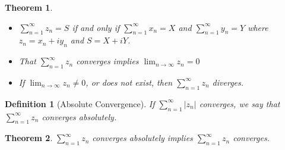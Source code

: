 \documentclass[12pt]{article}
\newtheorem{definition}{Definition}[section]
\newtheorem{theorem}{Theorem}[section]
\theoremstyle{definition}
\begin{document}
\begin{theorem}
\normalfont \begin{itemize}
\item $\sum_{n=1}^\infty z_n = S$ if and only if $\sum_{n=1}^\infty x_n = X$ and $\sum_{n=1}^\infty y_n = Y$ where $z_n = x_n + iy_n$ and $S=X+iY$.
\item That $\sum_{n=1}^\infty z_n$ converges implies $\lim_{n\to\infty}z_n = 0$
\item If $\lim_{n\to\infty}z_n \neq 0$, or does not exist, then $\sum_{n=1}^\infty z_n$ diverges.
\end{itemize}
\end{theorem}
\begin{definition}[Absolute Convergence]
\normalfont If $\sum_{n=1}^\infty |z_n|$ converges, we say that $\sum_{n=1}^\infty z_n$ converges absolutely.\end{definition}
\begin{theorem}\normalfont $\sum_{n=1}^\infty z_n$ converges absolutely implies $\sum_{n=1}^\infty z_n$ converges.\end{theorem}
\end{document}
